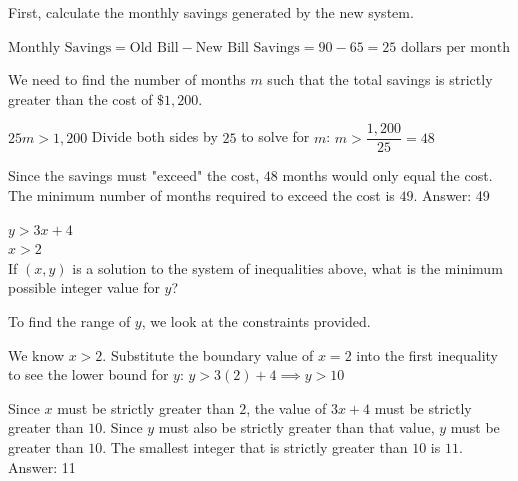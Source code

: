 \documentclass[11pt,paper=a4,answers]{exam}
\begin{document}
\begin{questions}
\begin{solution}
First, calculate the monthly savings generated by the new system.
\vspace{5pt}
\begin{center}
$\text{Monthly Savings} = \text{Old Bill} - \text{New Bill}$
\vspace{5pt}
$\text{Savings} = 90 - 65 = 25 \text{ dollars per month}$
\end{center}
\vspace{5pt}
We need to find the number of months $m$ such that the total savings is strictly greater than the cost of $\$1,200$.
\vspace{5pt}
\begin{center}
$25m > 1,200$
\vspace{5pt}
Divide both sides by $25$ to solve for $m$:
\vspace{5pt}
$m > \dfrac{1,200}{25} = 48$
\end{center}
\vspace{5pt}
Since the savings must "exceed" the cost, $48$ months would only equal the cost. The minimum number of months required to exceed the cost is $49$.
\vspace{5pt}
Answer: \colorbox{yellow!100}{49}
\end{solution}

\vspace{1cm}

\question
$y > 3x + 4$ \\
$x > 2$ \\
If $(x, y)$ is a solution to the system of inequalities above, what is the minimum possible integer value for $y$?

\begin{solution}
To find the range of $y$, we look at the constraints provided.
\vspace{5pt}
\begin{center}
We know $x > 2$.
\vspace{5pt}
Substitute the boundary value of $x = 2$ into the first inequality to see the lower bound for $y$:
\vspace{5pt}
$y > 3(2) + 4 \implies y > 10$
\end{center}
\vspace{5pt}
Since $x$ must be strictly greater than $2$, the value of $3x + 4$ must be strictly greater than $10$.
\vspace{5pt}
Since $y$ must also be strictly greater than that value, $y$ must be greater than $10$.
\vspace{5pt}
The smallest integer that is strictly greater than $10$ is $11$.
\vspace{5pt}
Answer: \colorbox{yellow!100}{11}
\end{solution}


\end{questions}
\end{document}
